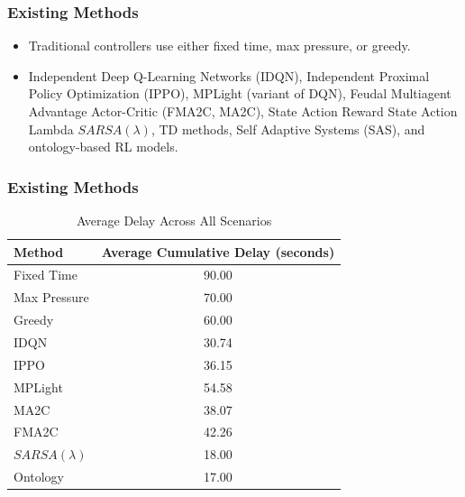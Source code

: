 \documentclass[compress,12pt]{beamer}
\begin{document}
\begin{frame}[bg=logo.png]
\end{frame}


\begin{frame}[bg=arguelles.png]
      \frametitle{Existing Methods}
      \begin{itemize}
      \item Traditional controllers use either fixed time, max pressure, or greedy.
      \item Independent Deep Q-Learning Networks (IDQN), Independent Proximal Policy Optimization (IPPO), MPLight (variant of DQN), Feudal Multiagent Advantage Actor-Critic (FMA2C, MA2C), State Action Reward State Action Lambda \(SARSA(\lambda)\), TD methods, Self Adaptive Systems (SAS), and ontology-based RL models.
      \end{itemize}

\end{frame}

\begin{frame}[bg=arguelles.png]
      \frametitle{Existing Methods}

    \begin{table}[H]
    \centering
    \small
    \begin{tabular}{lc}
    \hline
    \textbf{Method} & \textbf{Average Cumulative Delay (seconds)} \\ \hline
    Fixed Time      & 90.00\footnotemark[2]  \\
    Max Pressure    & 70.00\footnotemark[2]  \\
    Greedy          & 60.00\footnotemark[2]  \\
    IDQN            & 30.74                  \\
    IPPO            & 36.15                  \\
    MPLight         & 54.58                  \\
    MA2C            & 38.07\footnotemark[1]                  \\
    FMA2C           & 42.26                  \\
    \(SARSA(\lambda)\)           & 18.00\footnotemark[2]                  \\
    Ontology        & 17.00\footnotemark[2]                  \\ \hline
    \end{tabular}
    \caption{Average Delay Across All Scenarios}
    \label{tab:avg_delay}
    \end{table}
\end{frame}
\end{document}
